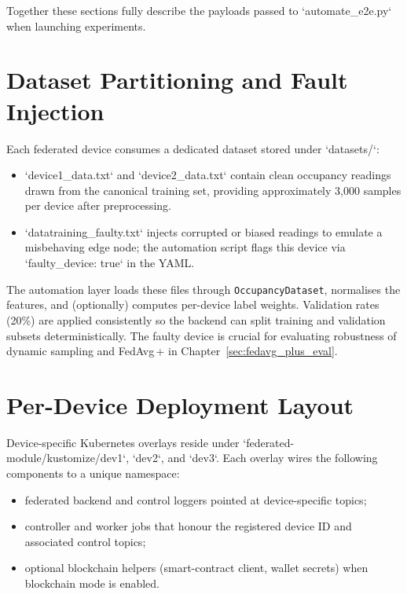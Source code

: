 Together these sections fully describe the payloads passed to `automate_e2e.py` when launching experiments.

\section{Dataset Partitioning and Fault Injection}
\label{sec:dataset_partitioning}

Each federated device consumes a dedicated dataset stored under `datasets/`:

\begin{itemize}
    \item `device1_data.txt` and `device2_data.txt` contain clean occupancy readings drawn from the canonical training set, providing approximately 3{,}000 samples per device after preprocessing.
    \item `datatraining_faulty.txt` injects corrupted or biased readings to emulate a misbehaving edge node; the automation script flags this device via `faulty_device: true` in the YAML.
\end{itemize}

The automation layer loads these files through \texttt{OccupancyDataset}, normalises the features, and (optionally) computes per-device label weights. Validation rates (20\%) are applied consistently so the backend can split training and validation subsets deterministically. The faulty device is crucial for evaluating robustness of dynamic sampling and FedAvg\,+ in Chapter~\ref{sec:fedavg_plus_eval}.

\section{Per-Device Deployment Layout}
\label{sec:deployment_layout}

Device-specific Kubernetes overlays reside under `federated-module/kustomize/dev1`, `dev2`, and `dev3`. Each overlay wires the following components to a unique namespace:

\begin{itemize}
    \item federated backend and control loggers pointed at device-specific topics;
    \item controller and worker jobs that honour the registered device ID and associated control topics;
    \item optional blockchain helpers (smart-contract client, wallet secrets) when blockchain mode is enabled.
\end{itemize}

